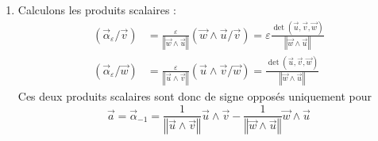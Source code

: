 \begin{enumerate}
\begin{enumerate}
\item Calculons les produits scalaires :
\begin{align*}
 (\overrightarrow \alpha_\varepsilon / \overrightarrow v) 
&= \frac{\varepsilon}{\left\Vert \overrightarrow w \wedge \overrightarrow u \right\Vert}(\overrightarrow w \wedge \overrightarrow u / \overrightarrow v) 
= \varepsilon
    \frac{\det(\overrightarrow u , \overrightarrow v , \overrightarrow w)}
          {\left\Vert \overrightarrow w \wedge \overrightarrow u \right\Vert} \\
 (\overrightarrow \alpha_\varepsilon / \overrightarrow w) 
&= \frac{\varepsilon}{\left\Vert \overrightarrow u \wedge \overrightarrow v \right\Vert}(\overrightarrow u \wedge \overrightarrow v / \overrightarrow w) 
= \frac{\det(\overrightarrow u , \overrightarrow v , \overrightarrow w)}
          {\left\Vert \overrightarrow w \wedge \overrightarrow u \right\Vert} 
\end{align*}
Ces deux produits scalaires sont donc de signe opposés uniquement pour 
\begin{displaymath}
 \overrightarrow a = \overrightarrow \alpha_{-1}
= \frac{1}{\left\Vert \overrightarrow u \wedge \overrightarrow v \right\Vert}\overrightarrow u \wedge \overrightarrow v 
-\frac{1}{\left\Vert \overrightarrow w \wedge \overrightarrow u \right\Vert}\overrightarrow w \wedge \overrightarrow u
\end{displaymath}


\end{enumerate}
\end{enumerate}
